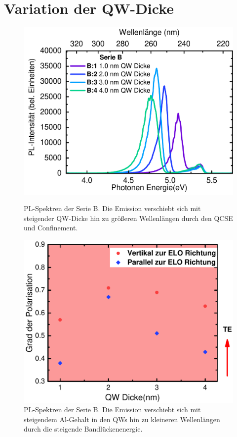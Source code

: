 \section{Variation der QW-Dicke}
\begin{figure}[htb]
  \centering
  \begin{minipage}[t]{0.49\textwidth}
    \centering
    \includegraphics[width=\textwidth]{Bilder/spektrenQWvariation.pdf}
    \caption{PL-Spektren der Serie B. Die Emission verschiebt sich mit steigender QW-Dicke hin zu gr\"oßeren Wellenl\"angen durch den QCSE und Confinement.  }
    \label{fig:qwvariationSpektrum}
  \end{minipage}
	\hfill
  \begin{minipage}[t]{0.49\textwidth}
    \centering
    \includegraphics[width=\linewidth]{Bilder/polarisationDickenvariation.pdf}
    \caption{PL-Spektren der Serie B. Die Emission verschiebt sich mit steigendem Al-Gehalt in den QWs hin zu kleineren Wellenl\"angen durch die steigende Bandl\"uckenenergie. }
    \label{fig:qwvariationPolarisation}
  \end{minipage}
\end{figure}
